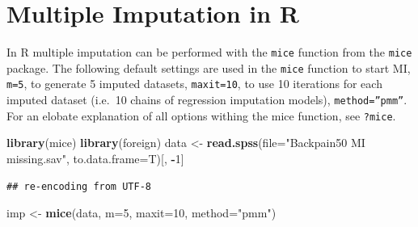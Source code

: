 \documentclass[]{book}
\newenvironment{Shaded}{\begin{snugshade}}{\end{snugshade}}
\newcommand{\KeywordTok}[1]{\textcolor[rgb]{0.13,0.29,0.53}{\textbf{#1}}}
\newcommand{\DataTypeTok}[1]{\textcolor[rgb]{0.13,0.29,0.53}{#1}}
\newcommand{\DecValTok}[1]{\textcolor[rgb]{0.00,0.00,0.81}{#1}}
\newcommand{\StringTok}[1]{\textcolor[rgb]{0.31,0.60,0.02}{#1}}
\newcommand{\OperatorTok}[1]{\textcolor[rgb]{0.81,0.36,0.00}{\textbf{#1}}}
\newcommand{\NormalTok}[1]{#1}
\begin{document}
\section{Multiple Imputation in R}\label{multiple-imputation-in-r}

In R multiple imputation can be performed with the \texttt{mice}
function from the \texttt{mice} package. The following default settings
are used in the \texttt{mice} function to start MI, \texttt{m=5}, to
generate 5 imputed datasets, \texttt{maxit=10}, to use 10 iterations for
each imputed dataset (i.e.~10 chains of regression imputation models),
\texttt{method=”pmm”}. For an elobate explanation of all options withing
the mice function, see \texttt{?mice}.

\begin{Shaded}
\begin{Highlighting}[]
\KeywordTok{library}\NormalTok{(mice)}
\KeywordTok{library}\NormalTok{(foreign)}
\NormalTok{data <-}\StringTok{ }\KeywordTok{read.spss}\NormalTok{(}\DataTypeTok{file=}\StringTok{"Backpain50 MI missing.sav"}\NormalTok{, }\DataTypeTok{to.data.frame=}\NormalTok{T)[, }\OperatorTok{-}\DecValTok{1}\NormalTok{]}
\end{Highlighting}
\end{Shaded}

\begin{verbatim}
## re-encoding from UTF-8
\end{verbatim}

\begin{Shaded}
\begin{Highlighting}[]
\NormalTok{imp <-}\StringTok{ }\KeywordTok{mice}\NormalTok{(data, }\DataTypeTok{m=}\DecValTok{5}\NormalTok{, }\DataTypeTok{maxit=}\DecValTok{10}\NormalTok{, }\DataTypeTok{method=}\StringTok{"pmm"}\NormalTok{)}
\end{Highlighting}
\end{Shaded}
\end{document}
